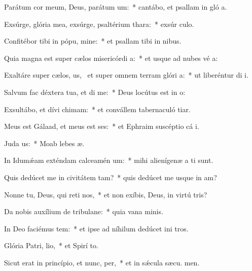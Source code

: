 \item Parátum cor meum, Deus, parátum  um:~* cantábo, et psallam in gló a.
\item Exsúrge, glória mea, exsúrge, psaltérium  thara:~* exsúr culo.
\item Confitébor tibi in pópu, mine:~* et psallam tibi in nibus.
\item Quia magna est super cælos misericórdi a:~* et usque ad nubes vé a:
\item Exaltáre super cælos, us,~\pscross{} et super omnem terram glóri a:~* ut liberéntur di i.
\item Salvum fac déxtera tua, et di me:~* Deus locútus est in  o:
\item Exsultábo, et dívi chimam:~* et convállem tabernaculó tiar.
\item Meus est Gálaad, et meus est ses:~* et Ephraim suscéptio cá i.
\item Juda  us:~* Moab lebes  æ.
\item In Idumǽam exténdam calceamén um:~* mihi alienígenæ a ti sunt.
\item Quis dedúcet me in civitátem tam?~* quis dedúcet me usque in am?
\item Nonne tu, Deus, qui reti nos,~* et non exíbis, Deus, in virtú tris?
\item Da nobis auxílium de tribulane:~* quia vana  minis.
\item In Deo faciémus tem:~* et ipse ad níhilum dedúcet ini tros.
\item Glória Patri,  lio,~* et Spirí to.
\item Sicut erat in princípio, et nunc,  per,~* et in sǽcula sæcu. men.
